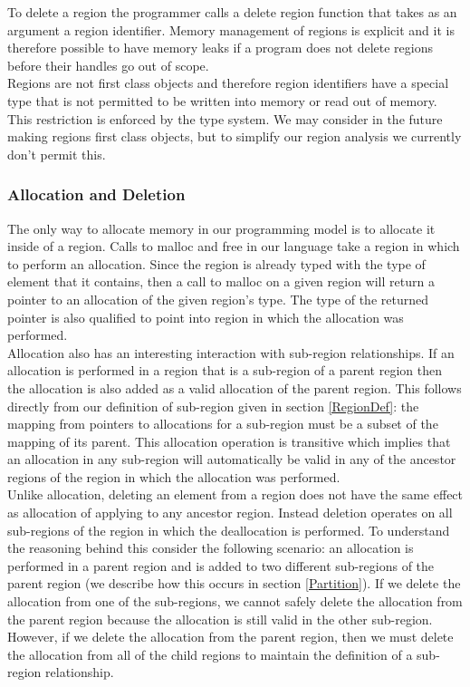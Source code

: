 \documentclass{article}
\theoremstyle{definition}
\begin{document}
\noindent
To delete a region the programmer calls a delete region function that takes
as an argument a region identifier.  Memory management of regions is explicit and
it is therefore possible to have memory leaks if a program does not delete
regions before their handles go out of scope.\\

\noindent
Regions are not first class objects and therefore region identifiers have a special
type that is not permitted to be written into memory or read out of memory.  This
restriction is enforced by the type system.  We may consider in the future making
regions first class objects, but to simplify our region analysis we currently
don't permit this.

\subsubsection{Allocation and Deletion \label{AllocDelete}}
\noindent
The only way to allocate memory in our programming model is to allocate it inside
of a region.  Calls to malloc and free in our language take a region in which to
perform an allocation.  Since the region is already typed with the type of element
that it contains, then a call to malloc on a given region will return a pointer to
an allocation of the given region's type.  The type of the returned pointer is
also qualified to point into region in which the allocation was performed. \\

\noindent
Allocation also has an interesting interaction with sub-region relationships.  If
an allocation is performed in a region that is a sub-region of a parent region
then the allocation is also added as a valid allocation of the parent region.  This
follows directly from our definition of sub-region given in section \ref{RegionDef}:
the mapping from pointers to allocations for a sub-region must be a subset of the
mapping of its parent.  This allocation operation is transitive which implies that
an allocation in any sub-region will automatically be valid in any of the ancestor
regions of the region in which the allocation was performed. \\

\noindent
Unlike allocation, deleting an element from a region does not have the same effect
as allocation of applying to any ancestor region.  Instead deletion operates on
all sub-regions of the region in which the deallocation is performed.  To understand
the reasoning behind this consider the following scenario: an allocation is performed in a
parent region and is added to two different sub-regions of the parent region (we
describe how this occurs in section \ref{Partition}).  If we delete the allocation
from one of the sub-regions, we cannot safely delete the allocation from the parent region
because the allocation is still valid in the other sub-region.  However, if we delete
the allocation from the parent region, then we must delete the allocation from all of
the child regions to maintain the definition of a sub-region relationship.
\end{document}
